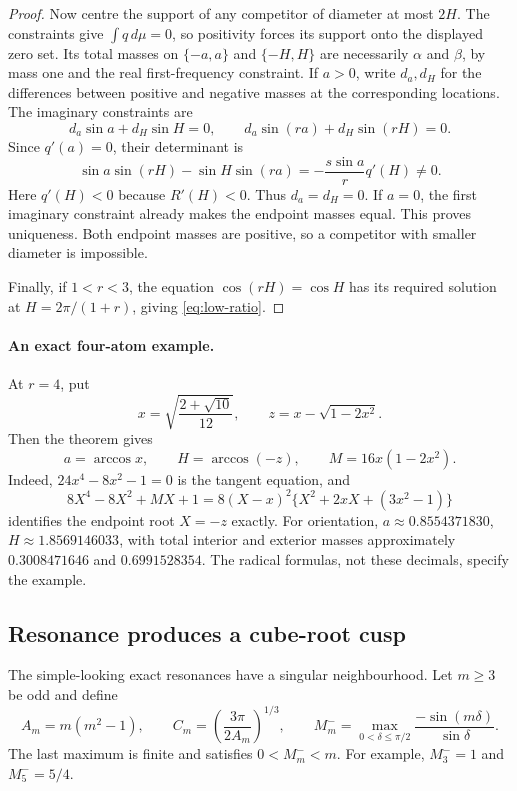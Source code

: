 \begin{proof}
Now centre the support of any competitor of diameter at most $2H$.
The constraints give $\int q\,d\mu=0$, so positivity forces its support
onto the displayed zero set. Its total masses on $\{-a,a\}$ and
$\{-H,H\}$ are necessarily $\alpha$ and $\beta$, by mass one and the
real first-frequency constraint. If $a>0$, write $d_a,d_H$ for the
differences between positive and negative masses at the corresponding
locations. The imaginary constraints are
\[
 d_a\sin a+d_H\sin H=0,\qquad
 d_a\sin(ra)+d_H\sin(rH)=0.
\]
Since $q'(a)=0$, their determinant is
\[
 \sin a\sin(rH)-\sin H\sin(ra)
   =-\frac{s\sin a}{r}q'(H)\ne0.
\]
Here $q'(H)<0$ because $R'(H)<0$. Thus $d_a=d_H=0$.
If $a=0$, the first imaginary constraint already makes the endpoint
masses equal. This proves uniqueness. Both endpoint masses are
positive, so a competitor with smaller diameter is impossible.

Finally, if $1<r<3$, the equation $\cos(rH)=\cos H$ has its required
solution at $H=2\pi/(1+r)$, giving \eqref{eq:low-ratio}.
\end{proof}

\paragraph{An exact four-atom example.}
At $r=4$, put
\[
 x=\sqrt{\frac{2+\sqrt{10}}{12}},\qquad
 z=x-\sqrt{1-2x^2}.
\]
Then the theorem gives
\[
 a=\arccos x,\qquad H=\arccos(-z),\qquad M=16x(1-2x^2).
\]
Indeed, $24x^4-8x^2-1=0$ is the tangent equation, and
\[
 8X^4-8X^2+MX+1
   =8(X-x)^2\{X^2+2xX+(3x^2-1)\}
\]
identifies the endpoint root $X=-z$ exactly. For orientation,
$a\approx0.8554371830$, $H\approx1.8569146033$, with total interior
and exterior masses approximately $0.3008471646$ and $0.6991528354$.
The radical formulas, not these decimals, specify the example.

\subsection{Resonance produces a cube-root cusp}

The simple-looking exact resonances have a singular neighbourhood.
Let $m\ge3$ be odd and define
\begin{equation}\label{eq:resonance-constants}
 A_m=m(m^2-1),\qquad
 C_m=\left(\frac{3\pi}{2A_m}\right)^{1/3},\qquad
 M_m^- =\max_{0<\delta\le\pi/2}
             \frac{-\sin(m\delta)}{\sin\delta}.
\end{equation}
The last maximum is finite and satisfies $0<M_m^-<m$. For example,
$M_3^-=1$ and $M_5^-=5/4$.

